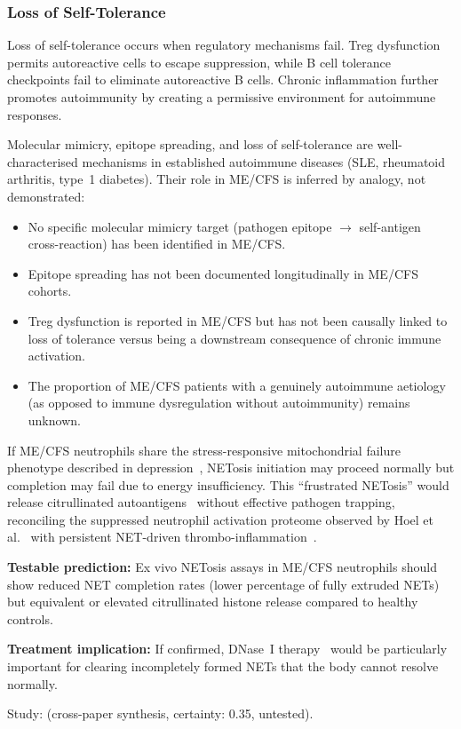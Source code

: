\subsubsection{Loss of Self-Tolerance}

Loss of self-tolerance occurs when regulatory mechanisms fail. Treg dysfunction permits autoreactive cells to escape suppression, while B cell tolerance checkpoints fail to eliminate autoreactive B cells. Chronic inflammation further promotes autoimmunity by creating a permissive environment for autoimmune responses.

\begin{limitation}
Molecular mimicry, epitope spreading, and loss of self-tolerance are well-characterised mechanisms in established autoimmune diseases (SLE, rheumatoid arthritis, type~1 diabetes). Their role in ME/CFS is inferred by analogy, not demonstrated:
\begin{itemize}
    \item No specific molecular mimicry target (pathogen epitope $\to$ self-antigen cross-reaction) has been identified in ME/CFS.
    \item Epitope spreading has not been documented longitudinally in ME/CFS cohorts.
    \item Treg dysfunction is reported in ME/CFS but has not been causally linked to loss of tolerance versus being a downstream consequence of chronic immune activation.
    \item The proportion of ME/CFS patients with a genuinely autoimmune aetiology (as opposed to immune dysregulation without autoimmunity) remains unknown.
\end{itemize}
\end{limitation}

\begin{hypothesis}
\label{hyp:frustrated-netosis}
If ME/CFS neutrophils share the stress-responsive mitochondrial failure phenotype
described in depression~\cite{Cullen2026ATP}, NETosis initiation may proceed normally
but completion may fail due to energy insufficiency. This ``frustrated NETosis''
would release citrullinated autoantigens~\cite{Monsalve2025} without effective
pathogen trapping, reconciling the suppressed neutrophil activation proteome
observed by Hoel et al.~\cite{Hoel2026proteome} with persistent NET-driven
thrombo-inflammation~\cite{Krinsky2023,Romano2022}.

\textbf{Testable prediction:} Ex vivo NETosis assays in ME/CFS neutrophils should
show reduced NET completion rates (lower percentage of fully extruded NETs) but
equivalent or elevated citrullinated histone release compared to healthy controls.

\textbf{Treatment implication:} If confirmed, DNase~I therapy~\cite{Veras2023}
would be particularly important for clearing incompletely formed NETs that the
body cannot resolve normally.

Study: (cross-paper synthesis, certainty: 0.35, untested).
\end{hypothesis}

